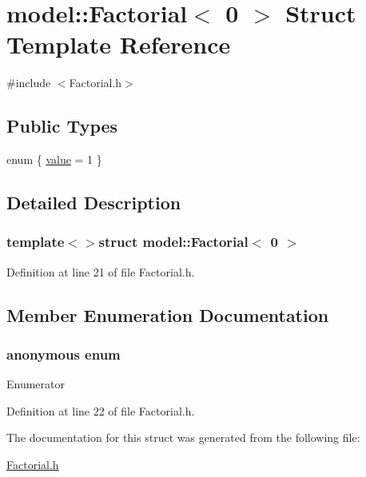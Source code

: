\hypertarget{structmodel_1_1_factorial_3_010_01_4}{}\section{model\+:\+:Factorial$<$ 0 $>$ Struct Template Reference}
\label{structmodel_1_1_factorial_3_010_01_4}


{\ttfamily \#include $<$Factorial.\+h$>$}

\subsection*{Public Types}
\begin{DoxyCompactItemize}
\item 
enum \{ \hyperlink{structmodel_1_1_factorial_3_010_01_4_a58a5ee6a76226364be447b815eddf244a5e96e9969fd20a4df7241df6ea11f4f1}{value} = 1
 \}
\end{DoxyCompactItemize}


\subsection{Detailed Description}
\subsubsection*{template$<$$>$struct model\+::\+Factorial$<$ 0 $>$}



Definition at line 21 of file Factorial.\+h.



\subsection{Member Enumeration Documentation}
\hypertarget{structmodel_1_1_factorial_3_010_01_4_a58a5ee6a76226364be447b815eddf244}{}\subsubsection[{anonymous enum}]{\setlength{\rightskip}{0pt plus 5cm}anonymous enum}\label{structmodel_1_1_factorial_3_010_01_4_a58a5ee6a76226364be447b815eddf244}
\begin{Desc}
\item[Enumerator]\par
\begin{description}
\item[{\em 
\hypertarget{structmodel_1_1_factorial_3_010_01_4_a58a5ee6a76226364be447b815eddf244a5e96e9969fd20a4df7241df6ea11f4f1}{}value\label{structmodel_1_1_factorial_3_010_01_4_a58a5ee6a76226364be447b815eddf244a5e96e9969fd20a4df7241df6ea11f4f1}
}]\end{description}
\end{Desc}


Definition at line 22 of file Factorial.\+h.



The documentation for this struct was generated from the following file\+:\begin{DoxyCompactItemize}
\item 
\hyperlink{_factorial_8h}{Factorial.\+h}\end{DoxyCompactItemize}
